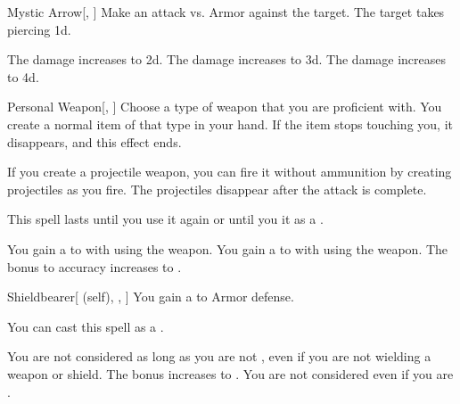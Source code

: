 \lowercase{\hypertarget{spell:Mystic Arrow}{}}\label{spell:Mystic Arrow}
\begin{freeability}[Rank 1]{\hypertarget{spell:Mystic Arrow}{Mystic Arrow}}[, ]
Make an attack vs. Armor against the target.
\hit The target takes piercing  \plus1d.

\rankline
{} The damage increases to  \plus2d.
 The damage increases to  \plus3d.
 The damage increases to  \plus4d.
\end{freeability}
\vspace{0.25em}



\lowercase{\hypertarget{spell:Personal Weapon}{}}\label{spell:Personal Weapon}
\begin{freeability}[Rank 1]{\hypertarget{spell:Personal Weapon}{Personal Weapon}}[, ]
Choose a type of weapon that you are proficient with.
You create a normal item of that type in your hand.
If the item stops touching you, it disappears, and this effect ends.

If you create a projectile weapon, you can fire it without ammunition by creating projectiles as you fire.
The projectiles disappear after the attack is complete.

This spell lasts until you use it again or until you  it as a .

\rankline
{} You gain a   to  with  using the weapon.
 You gain a   to  with  using the weapon.
 The bonus to accuracy increases to .
\end{freeability}
\vspace{0.25em}



\lowercase{\hypertarget{spell:Shieldbearer}{}}\label{spell:Shieldbearer}
\begin{attuneability}[Rank 1]{\hypertarget{spell:Shieldbearer}{Shieldbearer}}[ (self), , ]
You gain a   to Armor defense.

You can cast this spell as a .

\rankline
{} You are not considered  as long as you are not , even if you are not wielding a weapon or shield.
 The bonus increases to .
 You are not considered  even if you are .
\end{attuneability}
\vspace{0.25em}



